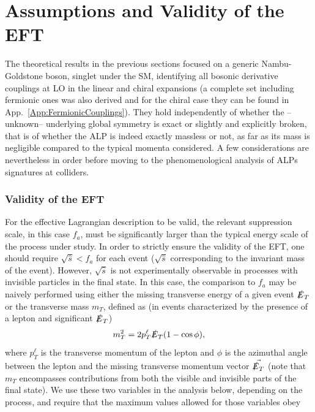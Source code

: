 \documentclass[11pt]{article}
\newcommand{\ETmiss}{\slashed{E}_T}
\renewcommand{\[}{\begin{equation}}
\renewcommand{\]}{\end{equation}}
\begin{document}
\section{Assumptions and Validity of the EFT}
\label{Sect:Validity}
The theoretical results in the previous sections focused on a generic Nambu-Goldstone boson,  singlet under the SM,  identifying all bosonic derivative couplings at 
LO  in the linear and chiral expansions (a complete set including fermionic ones was also derived and for the chiral case they can be found 
in App.~\ref{App:FermionicCouplings}). They hold independently of whether the --unknown-- underlying global symmetry is exact or slightly 
and explicitly broken, that is of whether the ALP is indeed exactly massless or not, as far as its mass is negligible compared to the typical momenta considered.
A few considerations are nevertheless in order before moving to the phenomenological analysis of ALPs signatures at colliders. 


\subsubsection*{Validity of the EFT} 

For the effective Lagrangian description to be valid, the relevant suppression scale, in this case $f_a$, must be significantly larger than the typical 
energy scale of the process under study. 
In order to strictly ensure the validity of the EFT, one should require 
$\sqrt{\hat{s}} < f_a$ for each event ($\sqrt{\hat{s}}$ corresponding to the invariant mass of the event).
However, $\sqrt{\hat{s}}$ is not experimentally observable in processes with invisible particles in the final state.
In this case, the comparison to $f_a$ may be naively performed using either the missing transverse energy of a given event 
$\ETmiss$ or the transverse mass $m_T$, defined as (in events characterized by the presence of a lepton and significant $\ETmiss$)
%
\begin{equation}
m_T^2  = 2 p_T^{\ell} \slashed{E}_T(1-\cos\phi) ,
\end{equation}
%
where $p_T^{\ell}$ is the transverse momentum of the lepton and $\phi$ is the azimuthal angle between the lepton  
 and the 
missing transverse momentum vector $\vec{\ETmiss}$ (note that $m_T$ encompasses contributions from both the visible and invisible 
parts of the final state). We use these two variables in the analysis below, depending on the process, and require that 
the maximum values allowed for those variables obey
\end{document}
